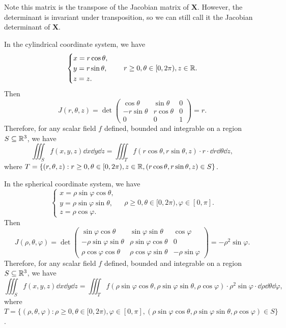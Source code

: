 \begin{remarkenv}
    Note this matrix is the transpose of the Jacobian matrix of $\bm X$. However, the determinant is invariant under transposition, so we can still call it the Jacobian determinant of $\bm X$.
\end{remarkenv}
\begin{corollaryenv}
    In the cylindrical coordinate system, we have
    $$ \begin{cases}
    x = r \cos \theta,\\
    y = r \sin \theta,\\
    z = z.
    \end{cases}
    \quad r \geq 0, \theta \in [0, 2\pi), z \in \mathbb{R}. $$
    Then
    \[
    J(r,\theta,z) = \det \begin{pmatrix} \cos \theta & \sin \theta & 0\\ -r \sin \theta & r \cos \theta & 0\\ 0 & 0 & 1 \end{pmatrix} = r.
    \]
    Therefore, for any scalar field $f$ defined, bounded and integrable on a region $S\subseteq \mathbb{R}^3$, we have
    \[
    \iiint_S f(x,y,z) \dd x \dd y \dd z = \iiint_T f(r \cos \theta, r \sin \theta, z)\cdot r\cdot \dd r \dd \theta \dd z,
    \]
    where $T = \{(r,\theta,z) : r \geq 0, \theta \in [0,2\pi), z \in \mathbb{R}, (r \cos \theta, r \sin \theta, z) \in S\}$.
\end{corollaryenv}
\begin{corollaryenv}
    In the spherical coordinate system, we have
    $$ \begin{cases}
    x = \rho \sin \varphi \cos \theta,\\
    y = \rho \sin \varphi \sin \theta,\\
    z = \rho \cos \varphi.
    \end{cases}
    \quad \rho \geq 0, \theta \in [0, 2\pi), \varphi \in [0,\pi]. $$
    Then
    \[
    J(\rho,\theta,\varphi) = \det \begin{pmatrix} \sin \varphi \cos \theta & \sin \varphi \sin \theta & \cos \varphi \\ -\rho \sin \varphi \sin \theta & \rho \sin \varphi \cos \theta & 0\\ \rho \cos \varphi \cos \theta & \rho \cos \varphi \sin \theta & -\rho \sin \varphi \end{pmatrix} = -\rho^2 \sin\varphi.
    \]
    Therefore, for any scalar field $f$ defined, bounded and integrable on a region $S\subseteq \mathbb{R}^3$, we have
    $$ 
    \iiint_S f(x,y,z) \dd x \dd y \dd z = \iiint_T f(\rho \sin \varphi \cos \theta, \rho \sin \varphi \sin \theta, \rho \cos \varphi)\cdot \rho^2 \sin\varphi\cdot \dd \rho \dd \theta \dd \varphi,
    $$
    where $T = \{(\rho,\theta,\varphi) : \rho \geq 0, \theta \in [0,2\pi), \varphi \in [0,\pi], (\rho \sin \varphi \cos \theta, \rho \sin \varphi \sin \theta, \rho \cos \varphi) \in S\}$.
\end{corollaryenv}
